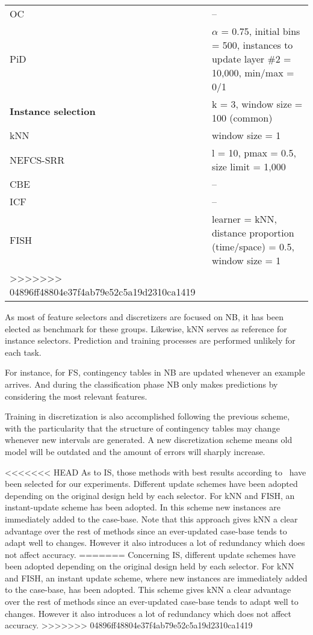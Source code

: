 \documentclass[preprint,12pt]{elsarticle}
\begin{document}
\begin{itemize}
\begin{table}[!htp]
{\begin{tabular}{|l|l|}
  OC &  --\\
  PiD & $\alpha$ = 0.75, initial bins = 500, instances to update layer \#2 = 10,000, min/max = 0/1\\
  \hline
  \textbf{Instance selection} & k = 3, window size = 100 (common)\\
  kNN & window size = 1\\  
  NEFCS-SRR & l = 10, pmax = 0.5, size limit = 1,000\\
  CBE& --\\
  ICF& --\\
  FISH & learner = kNN, distance proportion (time/space) = 0.5, window size = 1\\
  \hline
>>>>>>> 04896ff48804e37f4ab79e52c5a19d2310ca1419
  \end{tabular}
  }
\end{table}

As most of feature selectors and discretizers are focused on NB, it has been elected as benchmark for these groups. Likewise, kNN serves as reference for instance selectors. Prediction and training processes are performed unlikely for each task. 

For instance, for FS, contingency tables in NB are updated whenever an example arrives. And during the classification phase NB only makes predictions by considering the most relevant features. 

Training in discretization is also accomplished following the previous scheme, with the particularity that the structure of contingency tables may change whenever new intervals are generated. A new discretization scheme means old model will be outdated and the amount of errors will sharply increase. %

<<<<<<< HEAD
As to IS, those methods with best results according to~\cite{lu16} have been selected for our experiments. Different update schemes have been adopted depending on the original design held by each selector. For kNN and FISH, an instant-update scheme has been adopted. In this scheme new instances are immediately added to the case-base. Note that this approach gives kNN a clear advantage over the rest of methods since an ever-updated case-base tends to adapt well to changes. However it also introduces a lot of redundancy which does not affect accuracy. 
=======
Concerning IS, different update schemes have been adopted depending on the original design held by each selector. For kNN and FISH, an instant update scheme, where new instances are immediately added to the case-base, has been adopted. This scheme gives kNN a clear advantage over the rest of methods since an ever-updated case-base tends to adapt well to changes. However it also introduces a lot of redundancy which does not affect accuracy. 
>>>>>>> 04896ff48804e37f4ab79e52c5a19d2310ca1419



\end{itemize}
\end{document}
